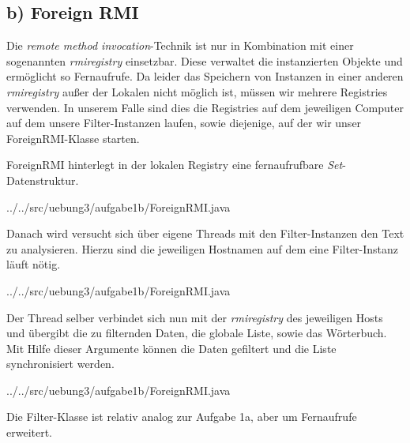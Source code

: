 \subsection*{b) Foreign RMI}

Die \textit{remote method invocation}-Technik ist nur in Kombination mit einer sogenannten \textit{rmiregistry} einsetzbar.
Diese verwaltet die instanzierten Objekte und ermöglicht so Fernaufrufe.
Da leider das Speichern von Instanzen in einer anderen \textit{rmiregistry} außer der Lokalen 
nicht möglich ist, müssen wir mehrere Registries verwenden.
In unserem Falle sind dies die Registries auf dem jeweiligen Computer auf dem unsere Filter-Instanzen laufen,
sowie diejenige, auf der wir unser ForeignRMI-Klasse starten.

ForeignRMI hinterlegt in der lokalen Registry eine fernaufrufbare \textit{Set}-Datenstruktur.

{../../src/uebung3/aufgabe1b/ForeignRMI.java}

Danach wird versucht sich über eigene Threads mit den Filter-Instanzen den Text zu analysieren.
Hierzu sind die jeweiligen Hostnamen auf dem eine Filter-Instanz läuft nötig.

{../../src/uebung3/aufgabe1b/ForeignRMI.java}

Der Thread selber verbindet sich nun mit der \textit{rmiregistry} des jeweiligen Hosts und 
übergibt die zu filternden Daten, die globale Liste, sowie das Wörterbuch.
Mit Hilfe dieser Argumente können die Daten gefiltert und die Liste synchronisiert werden.

{../../src/uebung3/aufgabe1b/ForeignRMI.java}

Die Filter-Klasse ist relativ analog zur Aufgabe 1a, aber um Fernaufrufe erweitert.
